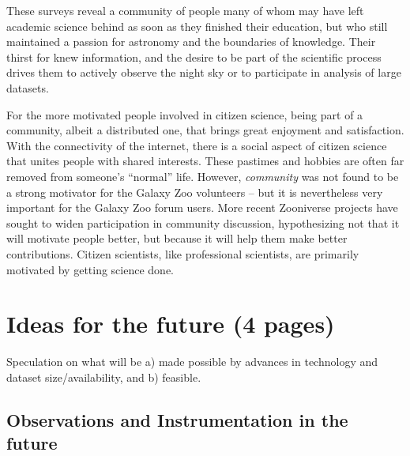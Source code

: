 \documentclass{ar2e}
\begin{document}
These surveys reveal a community of people many of whom may have left  
academic science behind as soon as they finished their  education, but who
still maintained a passion for astronomy and the  boundaries of knowledge. 
Their thirst for knew information, and the  desire to be part of the 
scientific process drives them to actively observe the  night sky or to
participate in analysis of large datasets.  

For the more motivated people involved in citizen science, being part of a
community, 
albeit a distributed one, that brings great enjoyment and satisfaction.  With
the connectivity of the internet, there is a social  aspect of citizen science
that unites people with shared interests.   These pastimes and hobbies are
often far removed from someone's ``normal''  life. However, {\it community}
was not found to be a strong motivator for the Galaxy Zoo volunteers -- but it
is nevertheless very important for the Galaxy Zoo forum users. More recent
Zooniverse projects have sought to widen participation in community
discussion, hypothesizing not that it will motivate people better, but because
it will help them make better contributions. Citizen scientists, like
professional scientists, are primarily motivated by getting science done.



\section{Ideas for the future (4 pages)}
\label{sec:future}

Speculation on what will be a) made possible by advances in technology and
dataset size/availability, and b) feasible.


\subsection{Observations and Instrumentation in the future}
\label{sec:future:obs}
\end{document}
